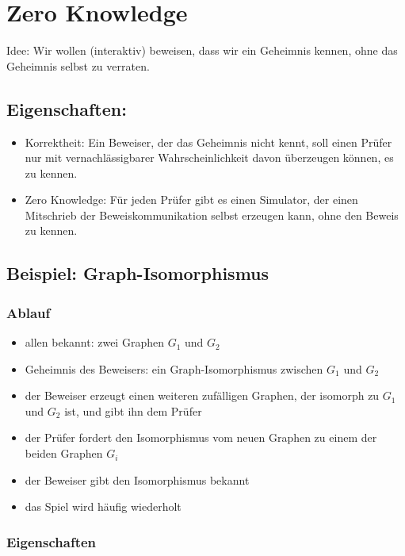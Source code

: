 \documentclass[a4paper,twoside,DIV15,BCOR12mm]{scrbook}
\begin{document}

\chapter{Zero Knowledge}

Idee: Wir wollen (interaktiv) beweisen, dass wir ein Geheimnis kennen, ohne das Geheimnis selbst zu verraten. 

\section{Eigenschaften:} 

\begin{itemize}
	\item Korrektheit: Ein Beweiser, der das Geheimnis nicht kennt, soll einen Prüfer nur mit vernachlässigbarer Wahrscheinlichkeit davon überzeugen können, es zu kennen.
	\item Zero Knowledge: Für jeden Prüfer gibt es einen Simulator, der einen Mitschrieb der Beweiskommunikation selbst erzeugen kann, ohne den Beweis zu kennen.
\end{itemize}

\section{Beispiel: Graph-Isomorphismus}

\subsection{Ablauf}

\begin{itemize}
	\item allen bekannt: zwei Graphen $G_1$ und $G_2$
	\item Geheimnis des Beweisers: ein Graph-Isomorphismus zwischen $G_1$ und $G_2$
	\item der Beweiser erzeugt einen weiteren zufälligen Graphen, der isomorph zu $G_1$ und $G_2$ ist, und gibt ihn dem Prüfer
	\item der Prüfer fordert den Isomorphismus vom neuen Graphen zu einem der beiden Graphen $G_i$
	\item der Beweiser gibt den Isomorphismus bekannt
	\item das Spiel wird häufig wiederholt
\end{itemize}

\subsection{Eigenschaften}
\end{document}
